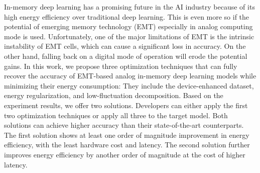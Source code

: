 \documentclass[10pt,journal,compsoc]{IEEEtran}
\begin{document}
In-memory deep learning has a promising future in the AI industry because of its high energy efficiency over traditional deep learning. This is even more so if the potential of emerging memory technology (EMT) especially in analog computing mode is used. Unfortunately, one of the major limitations of EMT is the intrinsic instability of EMT cells, which can cause a significant loss in accuracy. On the other hand, falling back on a digital mode of operation will erode the potential gains. In this work, we propose three optimization techniques that can fully recover the accuracy of EMT-based analog in-memory deep learning models while minimizing their energy consumption: They include the device-enhanced dataset, energy regularization, and low-fluctuation decomposition. Based on the experiment results, we offer two solutions. Developers can either apply the first two optimization techniques or apply all three to the target model. Both solutions can achieve higher accuracy than their state-of-the-art counterparts. The first solution shows at least one order of magnitude improvement in energy efficiency, with the least hardware cost and latency. The second solution further improves energy efficiency by another order of magnitude at the cost of higher latency.







\end{document}
